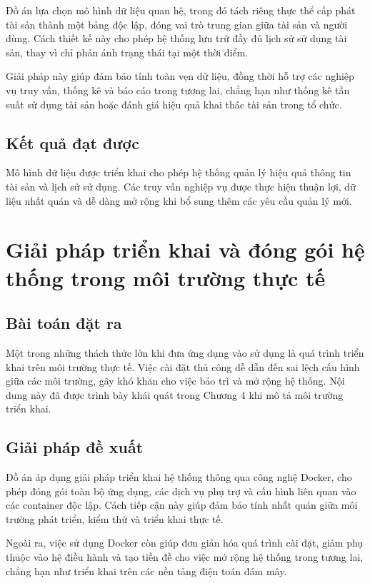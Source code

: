 \documentclass[../DoAn.tex]{subfiles}
\begin{document}
Đồ án lựa chọn mô hình dữ liệu quan hệ, trong đó tách riêng thực thể cấp phát tài sản thành một bảng độc lập, đóng vai trò trung gian giữa tài sản và người dùng. Cách thiết kế này cho phép hệ thống lưu trữ đầy đủ lịch sử sử dụng tài sản, thay vì chỉ phản ánh trạng thái tại một thời điểm.

Giải pháp này giúp đảm bảo tính toàn vẹn dữ liệu, đồng thời hỗ trợ các nghiệp vụ truy vấn, thống kê và báo cáo trong tương lai, chẳng hạn như thống kê tần suất sử dụng tài sản hoặc đánh giá hiệu quả khai thác tài sản trong tổ chức.

\subsection{Kết quả đạt được}

Mô hình dữ liệu được triển khai cho phép hệ thống quản lý hiệu quả thông tin tài sản và lịch sử sử dụng. Các truy vấn nghiệp vụ được thực hiện thuận lợi, dữ liệu nhất quán và dễ dàng mở rộng khi bổ sung thêm các yêu cầu quản lý mới.

\section{Giải pháp triển khai và đóng gói hệ thống trong môi trường thực tế}

\subsection{Bài toán đặt ra}

Một trong những thách thức lớn khi đưa ứng dụng vào sử dụng là quá trình triển khai trên môi trường thực tế. Việc cài đặt thủ công dễ dẫn đến sai lệch cấu hình giữa các môi trường, gây khó khăn cho việc bảo trì và mở rộng hệ thống. Nội dung này đã được trình bày khái quát trong Chương 4 khi mô tả môi trường triển khai.

\subsection{Giải pháp đề xuất}

Đồ án áp dụng giải pháp triển khai hệ thống thông qua công nghệ Docker, cho phép đóng gói toàn bộ ứng dụng, các dịch vụ phụ trợ và cấu hình liên quan vào các container độc lập. Cách tiếp cận này giúp đảm bảo tính nhất quán giữa môi trường phát triển, kiểm thử và triển khai thực tế.

Ngoài ra, việc sử dụng Docker còn giúp đơn giản hóa quá trình cài đặt, giảm phụ thuộc vào hệ điều hành và tạo tiền đề cho việc mở rộng hệ thống trong tương lai, chẳng hạn như triển khai trên các nền tảng điện toán đám mây.
\end{document}
